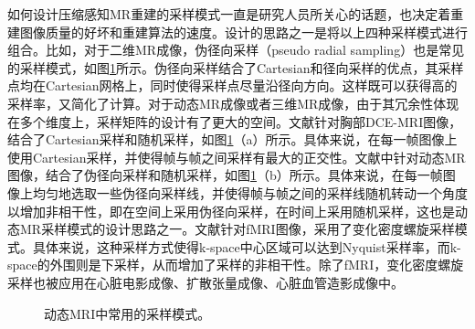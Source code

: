 如何设计压缩感知MR重建的采样模式一直是研究人员所关心的话题，也决定着重建图像质量的好坏和重建算法的速度。设计的思路之一是将以上四种采样模式进行组合。比如，对于二维MR成像，伪径向采样\cite{Sajan2011Accelerated}（pseudo radial sampling）也是常见的采样模式，如图\ref{fig:mask1}所示。伪径向采样结合了Cartesian和径向采样的优点，其采样点均在Cartesian网格上，同时使得采样点尽量沿径向方向。这样既可以获得高的采样率，又简化了计算。对于动态MR成像或者三维MR成像，由于其冗余性体现在多个维度上，采样矩阵的设计有了更大的空间。文献\cite{smith2012}针对胸部DCE-MRI图像，结合了Cartesian采样和随机采样，如图\ref{fig:mask1}（a）所示。具体来说，在每一帧图像上使用Cartesian采样，并使得帧与帧之间采样有最大的正交性。文献\cite{Sajan2011Accelerated}中针对动态MR图像，结合了伪径向采样和随机采样，如图\ref{fig:mask1}（b）所示。具体来说，在每一帧图像上均匀地选取一些伪径向采样线，并使得帧与帧之间的采样线随机转动一个角度以增加非相干性，即在空间上采用伪径向采样，在时间上采用随机采样，这也是动态MR采样模式的设计思路之一。文献\cite{holland2013compressed}针对fMRI图像，采用了变化密度螺旋采样模式。具体来说，这种采样方式使得k-space中心区域可以达到Nyquist采样率，而k-space的外围则是下采样，从而增加了采样的非相干性。除了fMRI，变化密度螺旋采样也被应用在心脏电影成像\cite{kressler2007three}、扩散张量成像\cite{karampinos2009high}、心脏血管造影成像\cite{santos2006single}中。

\begin{figure}[htbp]
\centering
{}
\caption{动态MRI中常用的采样模式。}
\label{fig:mask1}
\end{figure}

